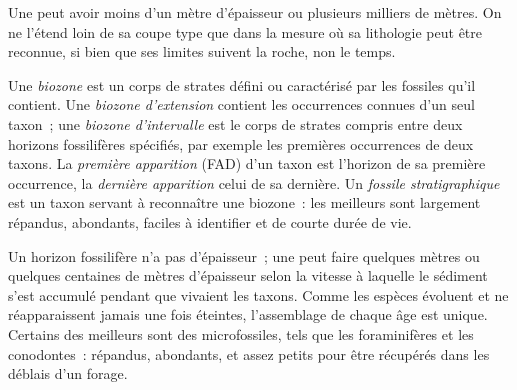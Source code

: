 Une  peut avoir moins d'un mètre d'épaisseur ou plusieurs milliers de mètres. On ne
l'étend loin de sa coupe type que dans la mesure où sa lithologie peut être
reconnue, si bien que ses limites suivent la roche, non le temps.

\begin{definition}\label{def:b1:stratigraphic-scale:biozone}
Une \emph{biozone} est un corps de strates défini ou caractérisé par
les fossiles qu'il contient. Une \emph{biozone d'extension} contient les occurrences connues d'un seul
taxon~; une \emph{biozone d'intervalle} est le corps de strates compris entre deux
horizons fossilifères spécifiés, par exemple les premières occurrences de deux taxons. La
\emph{première apparition} (FAD) d'un taxon est
l'horizon de sa première occurrence, la \emph{dernière
apparition} celui de
sa dernière. Un \emph{fossile stratigraphique} est un taxon servant à
reconnaître une biozone~: les meilleurs sont largement répandus, abondants, faciles à identifier et
de courte durée de vie.
\end{definition}

Un horizon fossilifère n'a pas d'épaisseur~; une  peut faire quelques mètres ou quelques centaines de mètres
d'épaisseur selon la vitesse à laquelle le sédiment s'est accumulé pendant que vivaient les taxons.
Comme les espèces évoluent et ne réapparaissent jamais une fois éteintes, l'assemblage de chaque
âge est unique. Certains des meilleurs  sont des microfossiles, tels que
les foraminifères et les conodontes~: répandus, abondants, et assez petits pour être
récupérés dans les déblais d'un forage.

